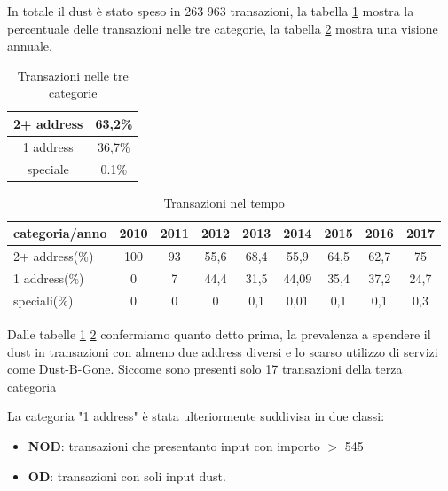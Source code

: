 In totale il dust è stato speso in 263 963 transazioni, la tabella \ref{tab:tx_categories} mostra la percentuale delle transazioni nelle tre categorie, la tabella \ref{tab:tx_categories_year} mostra una visione annuale.
\begin{table}[H]
    \centering
    \begin{tabular}{|c|c|}
        \hline
        2+ address & 63,2\%\\
        \hline
        1 address & 36,7\%\\
        \hline
        speciale & 0.1\%\\
        \hline
    \end{tabular}
    \caption{Transazioni nelle tre categorie}
    \label{tab:tx_categories}
\end{table}
\begin{table}[H]
    \centering
    \begin{tabular}{|l|c|c|c|c|c|c|c|c|}
        \hline
            categoria/anno  & 2010 & 2011 & 2012 & 2013 & 2014 & 2015 & 2016 & 2017\\
        \hline 
         2+ address(\%) & 100 & 93 & 55,6 & 68,4 & 55,9 & 64,5 & 62,7 & 75 \\
         \hline
         1 address(\%) & 0 & 7 & 44,4 & 31,5 & 44,09 & 35,4 & 37,2 & 24,7  \\
         \hline
         speciali(\%) & 0 & 0 & 0 & 0,1 & 0,01 & 0,1 & 0,1 & 0,3 \\
         \hline
    \end{tabular}
    \caption{Transazioni nel tempo}
    \label{tab:tx_categories_year}
\end{table}
Dalle tabelle \ref{tab:tx_categories} \ref{tab:tx_categories_year} confermiamo quanto detto prima, la prevalenza a spendere il dust in transazioni con almeno due address diversi e lo scarso utilizzo di servizi come Dust-B-Gone. Siccome sono presenti solo 17 transazioni della terza categoria 

La categoria "1 address" è stata ulteriormente suddivisa in due classi:
\begin{itemize}
    \item \textbf{NOD}: transazioni che presentanto input con importo $>$ 545  
    \item \textbf{OD}: transazioni con soli input dust.
\end{itemize}

